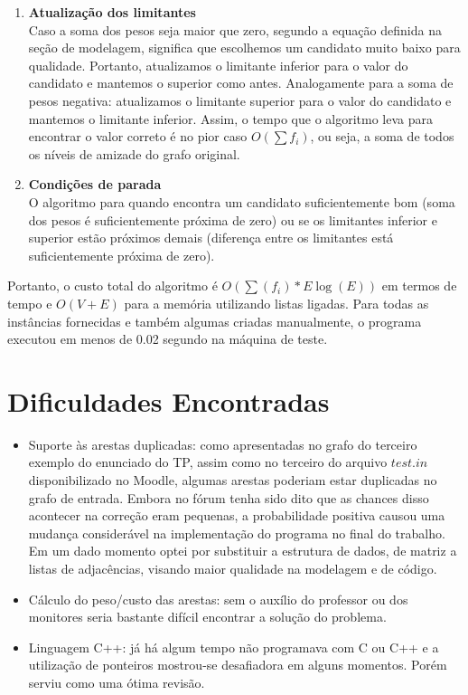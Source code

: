 \documentclass[a4paper,12pt,titlepage]{article}
\begin{document}
\begin{enumerate}
\item\textbf{Atualização dos limitantes} \\
Caso a soma dos pesos seja maior que zero, segundo a equação definida na seção de modelagem, significa que escolhemos um candidato muito baixo para qualidade. Portanto, atualizamos o limitante inferior para o valor do candidato e mantemos o superior como antes. Analogamente para a soma de pesos negativa: atualizamos o limitante superior para o valor do candidato e mantemos o limitante inferior.
Assim, o tempo que o algoritmo leva para encontrar o valor correto é no pior caso $O(\sum{f_i})$, ou seja, a soma de todos os níveis de amizade do grafo original.

\item\textbf{Condições de parada} \\
O algoritmo para quando encontra um candidato suficientemente bom (soma dos pesos é suficientemente próxima de zero) ou se os limitantes inferior e superior estão próximos demais (diferença entre os limitantes está suficientemente próxima de zero). 

\end{enumerate}

Portanto, o custo total do algoritmo é $O(\sum({f_i}) * E\log(E))$ em termos de tempo e $O(V + E)$ para a memória utilizando listas ligadas. Para todas as instâncias fornecidas e também algumas criadas manualmente, o programa executou em menos de 0.02 segundo na máquina de teste.

\section{Dificuldades Encontradas}

\begin{itemize}
\item {Suporte às arestas duplicadas:} como apresentadas no grafo do terceiro exemplo do enunciado do TP, assim como no terceiro do arquivo $test.in$ disponibilizado no Moodle, algumas arestas poderiam estar duplicadas no grafo de entrada. Embora no fórum tenha sido dito que as chances disso acontecer na correção eram pequenas, a probabilidade positiva causou uma mudança considerável na implementação do programa no final do trabalho. Em um dado momento optei por substituir a estrutura de dados, de matriz a listas de adjacências, visando maior qualidade na modelagem e de código.

\item {Cálculo do peso/custo das arestas:} sem o auxílio do professor ou dos monitores seria bastante difícil encontrar a solução do problema.

\item {Linguagem C++:} já há algum tempo não programava com C ou C++ e a utilização de ponteiros mostrou-se desafiadora em alguns momentos. Porém serviu como uma ótima revisão. 

\end{itemize}
\end{document}
